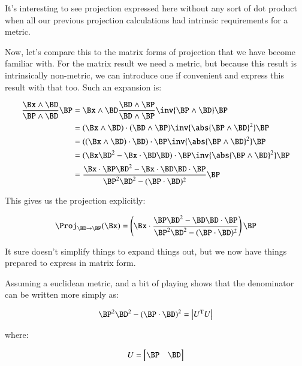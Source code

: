 \documentclass{article}      %
\newcommand{\T}[0]{\text{T}}
\begin{document}
It's interesting to see projection expressed here without any sort of dot
product when all our previous projection calculations had intrinsic
requirements for a metric.

Now, let's compare this to the matrix forms of projection that we have become familiar with.  For the matrix result we need a metric, but because
this result is intrinsically non-metric, we can introduce one if convenient and express this result with that too.  Such an expansion is:

\begin{align*}
\frac{\Bx \wedge \BD}{\BP \wedge \BD} \BP
&=
\Bx \wedge \BD
\frac{\BD \wedge \BP}{\BD \wedge \BP}
\inv{\BP \wedge \BD}
\BP \\
&=
(\Bx \wedge \BD) \cdot (\BD \wedge \BP)
\inv{\abs{\BP \wedge \BD}^2}
\BP \\
&=
((\Bx \wedge \BD) \cdot \BD) \cdot \BP
\inv{\abs{\BP \wedge \BD}^2}
\BP \\
&=
(
\Bx \BD^2 - \Bx \cdot \BD \BD
) \cdot \BP
\inv{\abs{\BP \wedge \BD}^2}
\BP \\
&=
\frac{\Bx \cdot \BP \BD^2 - \Bx \cdot \BD \BD \cdot \BP}
{\BP^2 \BD^2 - (\BP \cdot \BD)^2
}
\BP \\
\end{align*}

This gives us the projection explicitly:

\begin{equation}\label{eqn:obliqueProjNearMatrixForm}
\Proj_{\BD \rightarrow \BP}(\Bx)
=
\left(\Bx \cdot \frac{\BP \BD^2 - \BD \BD \cdot \BP}{\BP^2 \BD^2 - (\BP \cdot \BD)^2}\right)
\BP
\end{equation}

It sure doesn't simplify things to expand things out, but we now have things prepared to express in matrix form.

Assuming a euclidean metric, and a bit of playing shows that the denominator can be written more simply as:

\[
\BP^2 \BD^2 - (\BP \cdot \BD)^2 =
\begin{vmatrix}
U^\T U
\end{vmatrix}
\]

where:

\[
U =
\begin{bmatrix}
\BP & \BD \\
\end{bmatrix}
\]
\end{document}
